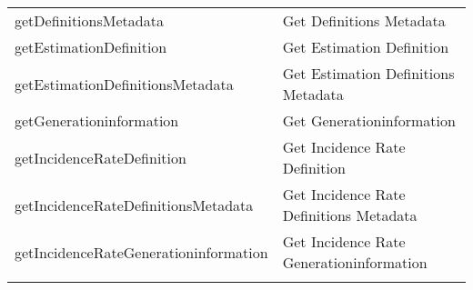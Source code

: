\documentclass[
]{article}
\begin{document}
\begin{longtable}[]{@{}ll@{}}
\begin{minipage}[t]{0.46\columnwidth}
getDefinitionsMetadata\strut
\end{minipage} & \begin{minipage}[t]{0.48\columnwidth}\raggedright
Get Definitions Metadata\strut
\end{minipage}\tabularnewline
\begin{minipage}[t]{0.46\columnwidth}\raggedright
getEstimationDefinition\strut
\end{minipage} & \begin{minipage}[t]{0.48\columnwidth}\raggedright
Get Estimation Definition\strut
\end{minipage}\tabularnewline
\begin{minipage}[t]{0.46\columnwidth}\raggedright
getEstimationDefinitionsMetadata\strut
\end{minipage} & \begin{minipage}[t]{0.48\columnwidth}\raggedright
Get Estimation Definitions Metadata\strut
\end{minipage}\tabularnewline
\begin{minipage}[t]{0.46\columnwidth}\raggedright
getGenerationinformation\strut
\end{minipage} & \begin{minipage}[t]{0.48\columnwidth}\raggedright
Get Generationinformation\strut
\end{minipage}\tabularnewline
\begin{minipage}[t]{0.46\columnwidth}\raggedright
getIncidenceRateDefinition\strut
\end{minipage} & \begin{minipage}[t]{0.48\columnwidth}\raggedright
Get Incidence Rate Definition\strut
\end{minipage}\tabularnewline
\begin{minipage}[t]{0.46\columnwidth}\raggedright
getIncidenceRateDefinitionsMetadata\strut
\end{minipage} & \begin{minipage}[t]{0.48\columnwidth}\raggedright
Get Incidence Rate Definitions Metadata\strut
\end{minipage}\tabularnewline
\begin{minipage}[t]{0.46\columnwidth}\raggedright
getIncidenceRateGenerationinformation\strut
\end{minipage} & \begin{minipage}[t]{0.48\columnwidth}\raggedright
Get Incidence Rate Generationinformation\strut
\end{minipage}\tabularnewline
\begin{minipage}[t]{0.46\columnwidth}\raggedright

\end{minipage}
\end{longtable}
\end{document}
